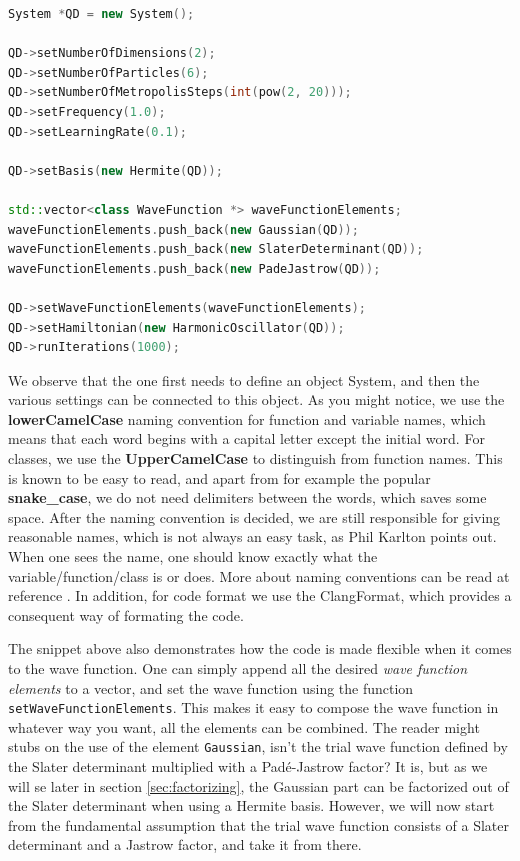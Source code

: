 \begin{lstlisting}[language={C++}]
System *QD = new System();

QD->setNumberOfDimensions(2);
QD->setNumberOfParticles(6);
QD->setNumberOfMetropolisSteps(int(pow(2, 20)));
QD->setFrequency(1.0);
QD->setLearningRate(0.1);

QD->setBasis(new Hermite(QD));

std::vector<class WaveFunction *> waveFunctionElements;
waveFunctionElements.push_back(new Gaussian(QD));
waveFunctionElements.push_back(new SlaterDeterminant(QD));
waveFunctionElements.push_back(new PadeJastrow(QD));

QD->setWaveFunctionElements(waveFunctionElements);
QD->setHamiltonian(new HarmonicOscillator(QD));
QD->runIterations(1000);
\end{lstlisting}
We observe that the one first needs to define an object System, and then the various settings can be connected to this object. As you might notice, we use the \textbf{lowerCamelCase} naming convention for function and variable names, which means that each word begins with a capital letter except the initial word. For classes, we use the \textbf{UpperCamelCase} to distinguish from function names. This is known to be easy to read, and apart from for example the popular \textbf{snake\_case}, we do not need delimiters between the words, which saves some space. After the naming convention is decided, we are still responsible for giving reasonable names, which is not always an easy task, as Phil Karlton points out. When one sees the name, one should know exactly what the variable/function/class is or does. More about naming conventions can be read at reference \cite{noauthor_naming_2019}. In addition, for code format we use the ClangFormat, which provides a consequent way of formating the code. 

The snippet above also demonstrates how the code is made flexible when it comes to the wave function. One can simply append all the desired \textit{wave function elements} to a vector, and set the wave function using the function \lstinline{setWaveFunctionElements}. This makes it easy to compose the wave function in whatever way you want, all the elements can be combined. The reader might stubs on the use of the element \lstinline{Gaussian}, isn't the trial wave function defined by the Slater determinant multiplied with a Padé-Jastrow factor? It is, but as we will se later in section \ref{sec:factorizing}, the Gaussian part can be factorized out of the Slater determinant when using a Hermite basis. However, we will now start from the fundamental assumption that the trial wave function consists of a Slater determinant and a Jastrow factor, and take it from there. 

